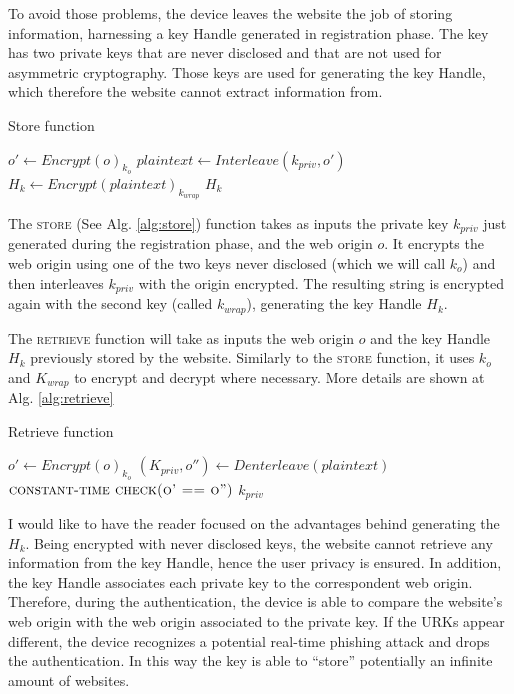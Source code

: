 To avoid those problems, the device leaves the website the job of storing information, harnessing a key Handle generated in registration phase. The key has two private keys that are never disclosed and that are not used for asymmetric cryptography. Those keys are used for generating the key Handle, which therefore the website cannot extract information from.

\begin{algorithm}[h]
    \caption{Store function}\label{alg:store}
    \begin{algorithmic}
        \State $o' \gets Encrypt(o)_{k_o}$
        \State $plaintext \gets Interleave(k_{priv}, o')$
        \State $H_k \gets Encrypt(plaintext)_{k_{wrap}}$
        \State \Return $H_k$
    \EndFunction
    \end{algorithmic}
\end{algorithm}

The \textsc{store} (See Alg. \ref{alg:store}) function takes as inputs the private key $k_{priv}$ just generated during the registration phase, and the web origin $o$. It encrypts the web origin using one of the two keys never disclosed (which we will call $k_o$) and then interleaves $k_{priv}$ with the origin encrypted. The resulting string is encrypted again with the second key (called $k_{wrap}$), generating the key Handle $H_k$.

The \textsc{retrieve} function will take as inputs the web origin $o$ and the key Handle $H_k$ previously stored by the website. Similarly to the \textsc{store} function, it uses $k_o$ and $K_{wrap}$ to encrypt and decrypt where necessary. More details are shown at Alg. \ref{alg:retrieve}

\begin{algorithm}[h]
    \caption{Retrieve function}\label{alg:retrieve}
    \begin{algorithmic}
        \State $o' \gets Encrypt(o)_{k_o}$
        \State $(K_{priv}, o'') \gets Denterleave(plaintext)$
        \State $\textsc{constant-time check(o' == o'')}$
        \State \Return $k_{priv}$
    \EndFunction
    \end{algorithmic}
\end{algorithm}

I would like to have the reader focused on the advantages behind generating the $H_k$. Being encrypted with never disclosed keys, the website cannot retrieve any information from the key Handle, hence the user privacy is ensured. In addition, the key Handle associates each private key to the correspondent web origin. Therefore, during the authentication, the device is able to compare the website's web origin with the web origin associated to the private key. If the URKs appear different, the device recognizes a potential real-time phishing attack and drops the authentication. In this way the key is able to ``store'' potentially an infinite amount of websites.

